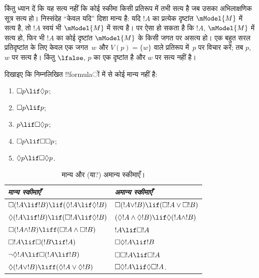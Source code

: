\documentclass[../../../include/open-logic-section]{subfiles}
\begin{document}
किंतु ध्यान दें कि यह सत्य नहीं कि कोई स्कीमा किसी प्रतिरूप में तभी सत्य है
जब उसका अभिलाक्षणिक सूत्र सत्य हो। निस्संदेह ``केवल यदि'' दिशा मान्य है:
यदि $!A$ का प्रत्येक दृष्टांत $\mModel{M}$ में सत्य है, तो $!A$ स्वयं भी
$\mModel{M}$ में सत्य है। पर ऐसा हो सकता है कि $!A$, $\mModel{M}$ में सत्य
हो, फिर भी $!A$ का कोई दृष्टांत $\mModel{M}$ के किसी जगत पर असत्य हो। एक
बहुत सरल प्रतिदृष्टांत के लिए केवल एक जगत~$w$ और $V(p) = \{w\}$ वाले
प्रतिरूप में~$p$ पर विचार करें; तब $p$, $w$ पर सत्य है। किंतु $\lfalse$,
$p$ का एक दृष्टांत है और $w$ पर सत्य नहीं है।

\begin{prob}
  दिखाइए कि निम्नलिखित !!{formula}ों में से कोई मान्य नहीं है:
  \begin{enumerate}
    \item[\Ax{D}:] \quad $\Box p \lif \Diamond p$;
    \item[\Ax{T}:] \quad $\Box p \lif p$;
    \item[\Ax{B}:] \quad $p \lif \Box\Diamond p$;
    \item[\Ax{4}:] \quad $\Box p \lif \Box \Box p$;
    \item[\Ax{5}:] \quad $\Diamond p \lif \Box \Diamond
      p$.
  \end{enumerate}
\end{prob}

\begin{table}[t]
    \centering
    \begin{tabular}{| l || l |}
      \hline
      {\emph{मान्य स्कीमाएँ}} & {\emph{अमान्य स्कीमाएँ}} \\
      \hline\hline
      $\Box(!A \lif !B) \lif (\Diamond !A \lif \Diamond !B)$
      & $\Box (!A \lor !B) \lif (\Box !A \lor \Box !B)$ \\
      $\Diamond (!A \lif !B) \lif (\Box !A \lif \Diamond
      !B)$
      & $(\Diamond !A \land \Diamond !B) \lif \Diamond (!A
      \land !B)$\\
      $\Box (!A \land !B) \liff (\Box !A \land \Box !B)$
      & $!A \lif \Box !A$ \\
      $\Box !A \lif \Box (!B \lif !A)$
      & $\Box \Diamond !A \lif !B$ \\
      $\lnot \Diamond !A \lif \Box (!A \lif !B)$
      & $\Box \Box !A \lif \Box !A$ \\
      $\Diamond (!A \lor !B) \liff (\Diamond !A \lor
      \Diamond !B)$
      & $\Box \Diamond !A \lif \Diamond \Box !A$. \\
      \hline
    \end{tabular}
    \caption{मान्य और (या?) अमान्य स्कीमाएँ।}
\end{table}
\end{document}
